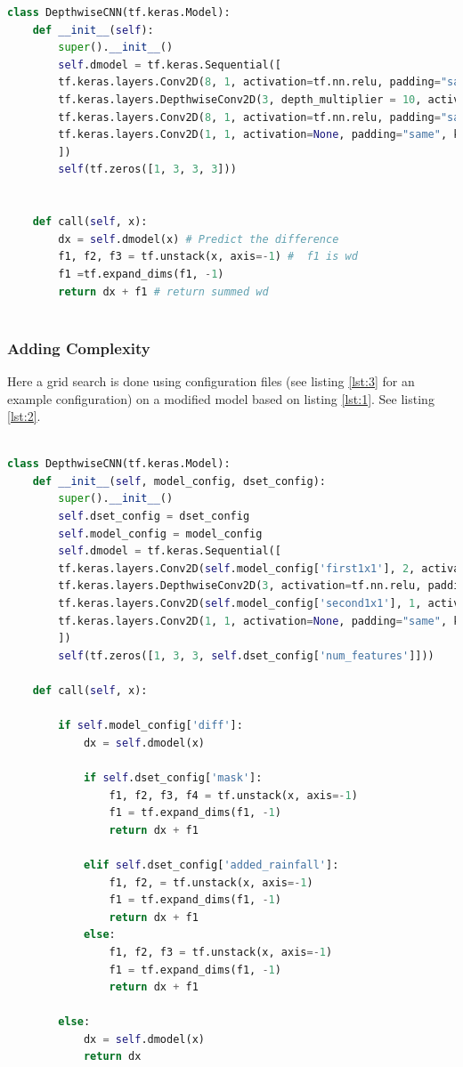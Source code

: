 \begin{lstlisting}[language=Python, label={lst:1}]
	class DepthwiseCNN(tf.keras.Model):
	def __init__(self):
		super().__init__()
		self.dmodel = tf.keras.Sequential([
		tf.keras.layers.Conv2D(8, 1, activation=tf.nn.relu, padding="same"),
		tf.keras.layers.DepthwiseConv2D(3, depth_multiplier = 10, activation=tf.nn.relu, padding="same"),
		tf.keras.layers.Conv2D(8, 1, activation=tf.nn.relu, padding="same"),
		tf.keras.layers.Conv2D(1, 1, activation=None, padding="same", kernel_initializer=tf.zeros_initializer)
		])
		self(tf.zeros([1, 3, 3, 3]))
	
	
	def call(self, x):
		dx = self.dmodel(x) # Predict the difference
		f1, f2, f3 = tf.unstack(x, axis=-1) #  f1 is wd
		f1 =tf.expand_dims(f1, -1)
		return dx + f1 # return summed wd
	
\end{lstlisting}

\subsubsection*{Adding Complexity}
Here a grid search is done using configuration files (see listing \ref{lst:3} for an example configuration) on a modified model based on listing \ref{lst:1}. See listing \ref{lst:2}.
\begin{lstlisting}[language=Python,  label={lst:2}]

class DepthwiseCNN(tf.keras.Model):
	def __init__(self, model_config, dset_config):
		super().__init__()
		self.dset_config = dset_config
		self.model_config = model_config
		self.dmodel = tf.keras.Sequential([
		tf.keras.layers.Conv2D(self.model_config['first1x1'], 2, activation=tf.nn.relu, padding="same"),
		tf.keras.layers.DepthwiseConv2D(3, activation=tf.nn.relu, padding="same", depth_multiplier=self.model_config['depth']),
		tf.keras.layers.Conv2D(self.model_config['second1x1'], 1, activation=tf.nn.relu, padding="same"),
		tf.keras.layers.Conv2D(1, 1, activation=None, padding="same", kernel_initializer=tf.zeros_initializer)
		])
		self(tf.zeros([1, 3, 3, self.dset_config['num_features']]))

	def call(self, x):
	
		if self.model_config['diff']:
			dx = self.dmodel(x)
			
			if self.dset_config['mask']:
				f1, f2, f3, f4 = tf.unstack(x, axis=-1)
				f1 = tf.expand_dims(f1, -1)
				return dx + f1
		
			elif self.dset_config['added_rainfall']:
				f1, f2, = tf.unstack(x, axis=-1)
				f1 = tf.expand_dims(f1, -1)
				return dx + f1
			else:
				f1, f2, f3 = tf.unstack(x, axis=-1)
				f1 = tf.expand_dims(f1, -1)
				return dx + f1
		
		else:
			dx = self.dmodel(x)
			return dx
	
\end{lstlisting}

